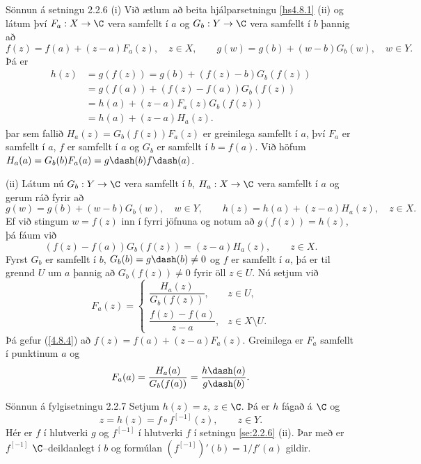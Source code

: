 \begin{sotx}{Sönnun á setningu 2.2.6} (i)  
Við ætlum að beita hjálparsetningu \ref{hs4.8.1} (ii) og 
látum því $F_a:X\to \C$ vera samfellt í $a$ og $G_b:Y\to \C$ vera
samfellt í $b$ þannig að 
 $$f(z)=f(a)+(z-a)F_a(z), \quad z\in X, \qquad g(w)=g(b)+(w-b)G_b(w), \quad
w\in Y. 
 $$
Þá er
\begin{align*}
h(z)&=g(f(z))=g(b)+(f(z)-b)G_b(f(z))\\
&=g(f(a))+(f(z)-f(a))G_b(f(z))\\
&=h(a)+(z-a)F_a(z)G_b(f(z))\\
&=h(a)+(z-a)H_a(z).
\end{align*}
þar sem fallið $H_a(z)=G_b(f(z))F_a(z)$ er greinilega samfellt í $a$, því
$F_a$ er samfellt í $a$, $f$ er samfellt í $a$  og $G_b$ er samfellt í
$b=f(a)$.  Við höfum $H_a(a)=G_b(b)F_a(a)=g\dash(b)f\dash(a)$. 


(ii)  Látum nú $G_b:Y\to \C$ vera samfellt í $b$,  $H_a:X\to \C$ vera
samfellt í $a$ og gerum ráð fyrir að
 $$g(w)=g(b)+(w-b)G_b(w), \quad
w\in Y, \qquad h(z)=h(a)+(z-a)H_a(z), \quad z\in X. 
 $$
Ef við stingum $w=f(z)$ inn í fyrri jöfnuna og notum að
$g(f(z))=h(z)$, þá fáum við 
 \begin{equation*}(f(z)-f(a))G_b(f(z))=(z-a)H_a(z),\qquad z\in X. \label{4.8.4}
 \end{equation*}
Fyrst $G_b$ er samfellt í $b$, $G_b(b)=g\dash(b)\neq 0$ og $f$ er
samfellt í $a$,  þá er til
grennd $U$ um $a$ þannig að $G_b(f(z))\neq 0$ fyrir öll $z\in U$.  Nú
setjum við 
 $$F_a(z)=\begin{cases}
\dfrac{H_a(z)}{G_b(f(z))}, &z\in U,\\
\dfrac{f(z)-f(a)}{z-a}, &z\in X\setminus U.
\end{cases}
 $$
Þá gefur (\ref{4.8.4}) að $f(z)=f(a)+(z-a)F_a(z)$.  Greinilega er $F_a$
samfellt í punktinum $a$ og
 $$F_a(a)=\dfrac{H_a(a)}{G_b(f(a))}=\dfrac{h\dash(a)}{g\dash(b)}.
 $$
 \end{sotx}


\begin{sotx}{Sönnun á fylgisetningu 2.2.7}
  Setjum $h(z)=z$, $z\in \C$.  Þá er $h$ fágað á $\C$ og 
 $$z=h(z)=f\circ f^{[-1]}(z), \qquad z\in Y.
 $$
Hér er $f$ í hlutverki $g$ og $f^{[-1]}$ í hlutverki $f$ í setningu
\ref{se:2.2.6} (ii).  Þar með er $f^{[-1]}$ $\C$--deildanlegt í $b$ og  
formúlan $(f^{[-1]})'(b)=1/f'(a)$ gildir.  
\end{sotx}



